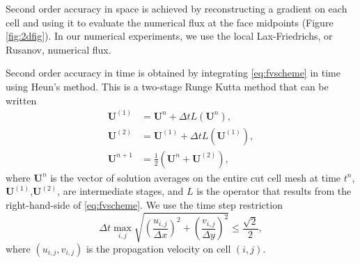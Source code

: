 Second order accuracy in space is achieved by reconstructing a gradient on each cell and using it to evaluate the numerical flux at the face midpoints (Figure \ref{fig:2dfig}).  
In our numerical experiments, we use the local Lax-Friedrichs, or Rusanov, numerical flux.

Second order accuracy in time is obtained by integrating \eqref{eq:fvscheme} in time using Heun's method.  This is a two-stage Runge Kutta method that can be written
\begin{equation}\label{eq:molscheme}
\begin{aligned}
	\mathbf{U}^{(1)} &= \mathbf{U}^{n} + \Delta t L(\mathbf{U}^n), \\
	\mathbf{U}^{(2)} &= \mathbf{U}^{(1)} + \Delta t L(\mathbf{U}^{(1)}), \\
	\mathbf{U}^{n+1} &= \frac{1}{2}( \mathbf{U}^{n} + \mathbf{U}^{(2)} ) ,	
\end{aligned}
\end{equation}
where $\mathbf{U}^{n}$ is the vector of solution averages on the entire cut cell mesh at time $t^n$, $\mathbf{U}^{(1)}$,$\mathbf{U}^{(2)}$, are intermediate stages, and $L$ is the operator that results from the right-hand-side of \eqref{eq:fvscheme}.
We use the time step restriction
\begin{equation}
\Delta t   \max_{i,j}\sqrt{\left(\frac{u_{i,j}}{\Delta x}\right)^2 + \left(\frac{v_{i,j}}{\Delta y}\right)^2} \leq \frac{\sqrt{2}}{2},
\end{equation}
where $(u_{i,j},v_{i,j})$ is the propagation velocity on cell $(i,j)$.  


